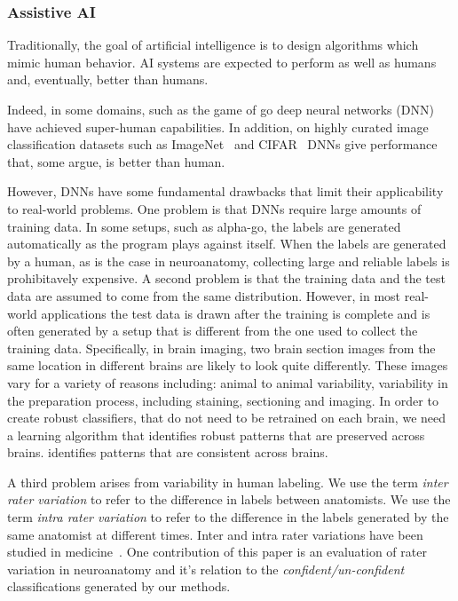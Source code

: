 \documentclass[runningheads]{llncs}
\begin{document}
\subsubsection{Assistive AI} Traditionally, the goal of artificial
  intelligence is to design algorithms which mimic human behavior. AI
  systems are expected to perform as well as humans and, eventually,
  better than humans.

Indeed, in some domains, such as the game of go \cite{silver2017mastering} deep neural
networks (DNN)  have achieved super-human capabilities. In addition,
on highly curated image classification datasets such as ImageNet~\cite{deng2009imagenet} and
CIFAR~\cite{krizhevsky2009learning} DNNs give performance that, some argue, is better than
human. 

However, DNNs have some fundamental drawbacks that limit their
applicability to real-world problems. One problem is that DNNs
require large amounts of training data. In some
setups, such as alpha-go, the labels are generated automatically as
the program plays against itself. When the labels are generated by a
human, as is the case in neuroanatomy, collecting large and reliable
labels is prohibitavely expensive. A second
problem is that the training data and the test data are assumed to
come from the same distribution. However, in most real-world
applications the test data is drawn after the training is complete and
is often generated by a setup that is different from the one used to
collect the training data.
Specifically, in brain imaging, two brain section images from the same
location in different brains are likely to look quite differently.
These images vary for a variety of reasons including: animal to animal variability,
variability in the preparation process, including staining,
sectioning and imaging. In order to create robust classifiers, that do
not need to be retrained on each brain, we need a learning algorithm
that identifies robust patterns that are preserved across brains.
identifies patterns that are consistent across brains.

A third problem arises from variability in human labeling. We use
the term {\em inter rater variation} to refer to the difference in
labels between anatomists. We use the term {\em intra rater
  variation} to refer to the difference in the labels generated by the
same anatomist at different times. Inter and intra rater variations
have been studied in medicine~\cite{gellhorn2013inter}. One
contribution of this paper is an evaluation of rater variation in
neuroanatomy and it's relation to the {\em confident/un-confident}
classifications generated by our methods.
\end{document}
